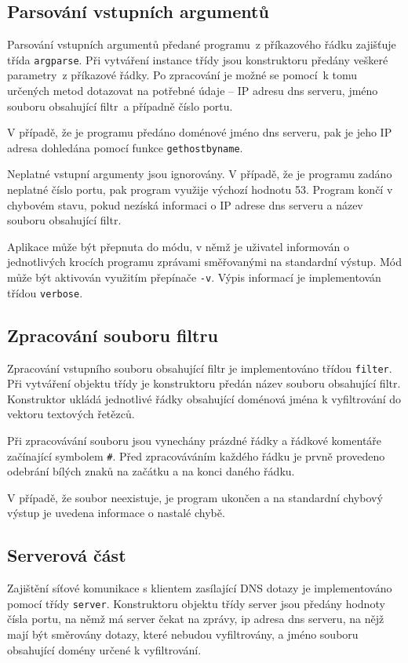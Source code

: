 \documentclass[a4paper, 11pt]{article}
\begin{document}
	\subsection{Parsování vstupních argumentů}
	Parsování vstupních argumentů předané programu~z příkazového řádku zajišťuje třída \texttt{argparse}. Při vytváření instance třídy jsou konstruktoru předány veškeré parametry~z příkazové řádky. Po zpracování je možné se pomocí~k tomu určených metod dotazovat na potřebné údaje -- IP adresu dns serveru, jméno souboru obsahující filtr~a případně číslo portu. 
	
	V případě, že je programu předáno doménové jméno dns serveru, pak je jeho IP adresa dohledána pomocí funkce \texttt{gethostbyname}. 
	
	Neplatné vstupní argumenty jsou ignorovány. V případě, že je programu zadáno neplatné číslo portu, pak program využije výchozí hodnotu 53. Program končí v chybovém stavu, pokud nezíská informaci o IP adrese dns serveru a název souboru obsahující filtr. 
	
	
	Aplikace může být přepnuta do módu, v němž je uživatel informován o jednotlivých krocích programu zprávami směřovanými na standardní výstup. Mód může být aktivován využitím přepínače \texttt{-v}. Výpis informací je implementován třídou \texttt{verbose}.

	\subsection{Zpracování souboru filtru}
	Zpracování vstupního souboru obsahující filtr je implementováno třídou \texttt{filter}. Při vytváření objektu třídy je konstruktoru předán název souboru obsahující filtr. Konstruktor ukládá jednotlivé řádky obsahující doménová jména k vyfiltrování do vektoru textových řetězců. 
	
	Při zpracovávání souboru jsou vynechány prázdné řádky a řádkové komentáře začínající symbolem \texttt{\#}. Před zpracováváním každého řádku je prvně provedeno odebrání bílých znaků na začátku a na konci daného řádku.
	
	V případě, že soubor neexistuje, je program ukončen a na standardní chybový výstup je uvedena informace o nastalé chybě. 
	
	\subsection{Serverová část}
	Zajištění síťové komunikace s klientem zasílající DNS dotazy je implementováno pomocí třídy \texttt{server}. Konstruktoru objektu třídy server jsou předány hodnoty čísla portu, na němž má server čekat na zprávy, ip adresa dns serveru, na nějž mají být směrovány dotazy, které nebudou vyfiltrovány, a jméno souboru obsahující domény určené k vyfiltrování.
	
\end{document}
